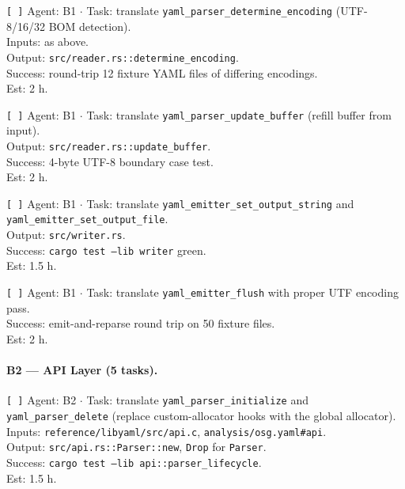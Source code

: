 \documentclass[12pt]{article}
\theoremstyle{definition}
\theoremstyle{remark}
\begin{document}
\begin{flushleft}
\texttt{[\,]} Agent: B1 \(\cdot\) Task: translate
\texttt{yaml\_parser\_determine\_encoding} (UTF-8/16/32 BOM detection).
\\
\quad Inputs: as above.
\\
\quad Output: \texttt{src/reader.rs::determine\_encoding}.
\\
\quad Success: round-trip 12 fixture YAML files of differing encodings.
\\
\quad Est: 2 h.
\end{flushleft}

\begin{flushleft}
\texttt{[\,]} Agent: B1 \(\cdot\) Task: translate
\texttt{yaml\_parser\_update\_buffer} (refill buffer from input).
\\
\quad Output: \texttt{src/reader.rs::update\_buffer}.
\\
\quad Success: 4-byte UTF-8 boundary case test.
\\
\quad Est: 2 h.
\end{flushleft}

\begin{flushleft}
\texttt{[\,]} Agent: B1 \(\cdot\) Task: translate
\texttt{yaml\_emitter\_set\_output\_string} and
\texttt{yaml\_emitter\_set\_output\_file}.
\\
\quad Output: \texttt{src/writer.rs}.
\\
\quad Success: \texttt{cargo test --lib writer} green.
\\
\quad Est: 1.5 h.
\end{flushleft}

\begin{flushleft}
\texttt{[\,]} Agent: B1 \(\cdot\) Task: translate
\texttt{yaml\_emitter\_flush} with proper UTF encoding pass.
\\
\quad Success: emit-and-reparse round trip on 50 fixture files.
\\
\quad Est: 2 h.
\end{flushleft}

\paragraph{B2 --- API Layer (5 tasks).}

\begin{flushleft}
\texttt{[\,]} Agent: B2 \(\cdot\) Task: translate
\texttt{yaml\_parser\_initialize} and \texttt{yaml\_parser\_delete}
(replace custom-allocator hooks with the global allocator).
\\
\quad Inputs: \texttt{reference/libyaml/src/api.c},
\texttt{analysis/osg.yaml\#api}.
\\
\quad Output: \texttt{src/api.rs::Parser::new},
\texttt{Drop} for \texttt{Parser}.
\\
\quad Success: \texttt{cargo test --lib api::parser\_lifecycle}.
\\
\quad Est: 1.5 h.
\end{flushleft}
\end{document}
